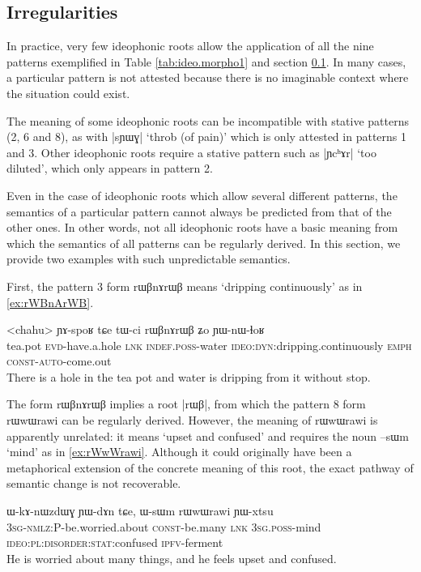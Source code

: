 \documentclass[oldfontcommands,oneside,a4paper,11pt]{article}
\newcommand{\ipa}[1]{{\phon \mbox{#1}}} %
\begin{document}
\subsection{Irregularities} \label{sec:ideo.irregular}
In practice, very few ideophonic roots allow the application of all the nine patterns exemplified in Table \ref{tab:ideo.morpho1}  and section \ref{sec:ideo.irregular}.  In many cases, a particular pattern is not attested because there is no imaginable context where the situation could exist.

The meaning of some ideophonic roots can be incompatible with stative patterns (2, 6 and 8), as with |\ipa{sɲɯɣ}| `throb (of pain)' which is only attested in patterns 1 and 3. Other ideophonic roots require a stative pattern such as |\ipa{ɲcʰɤr}| `too diluted', which only appears in pattern 2.

Even in the case of ideophonic roots which allow several different patterns, the semantics of a particular pattern cannot always be predicted from that of the other ones. In other words, not all ideophonic roots have a basic meaning from which the semantics of all patterns can be regularly derived. In this section, we provide two examples with such unpredictable semantics.

First, the pattern 3 form \ipa{rɯβnɤrɯβ} means `dripping continuously' as in \ref{ex:rWBnArWB}.
  \begin{exe} 
\ex  \label{ex:rWBnArWB}
\gll 
<chahu>  \ipa{ɲɤ-spoʁ}  	\ipa{tɕe}  	\ipa{tɯ-ci}  	\ipa{rɯβnɤrɯβ}  	\ipa{ʑo}  	\ipa{ɲɯ-nɯ-ɬoʁ}   \\
tea.pot \textsc{evd}-have.a.hole \textsc{lnk} \textsc{indef.poss}-water \textsc{ideo:dyn}:dripping.continuously \textsc{emph} \textsc{const-auto}-come.out  \\
\glt There is a hole in the tea pot and water  is dripping from it without stop.
  \end{exe}

The form  \ipa{rɯβnɤrɯβ} implies a root |\ipa{rɯβ}|, from which the pattern 8 form \ipa{rɯwɯrawi} can be regularly derived. However, the meaning of \ipa{rɯwɯrawi} is apparently unrelated: it means `upset and confused' and requires the noun \ipa{--sɯm} `mind' as in \ref{ex:rWwWrawi}. Although it could originally have been a metaphorical extension of the concrete meaning of this root, the  exact pathway of semantic change is not recoverable.

  \begin{exe} 
\ex  \label{ex:rWwWrawi}
\gll 
\ipa{ɯ-kɤ-nɯzdɯɣ}  	\ipa{ɲɯ-dɤn}  	\ipa{tɕe,}  	\ipa{ɯ-sɯm}  	\ipa{rɯwɯrawi}  	\ipa{ɲɯ-xtsu}  	  \\
\textsc{3sg-nmlz:}P-be.worried.about \textsc{const}-be.many \textsc{lnk} \textsc{3sg.poss}-mind \textsc{ideo:pl:disorder:stat}:confused \textsc{ipfv}-ferment   \\
\glt He is worried about many things, and he feels upset and confused.
  \end{exe}
\end{document}
